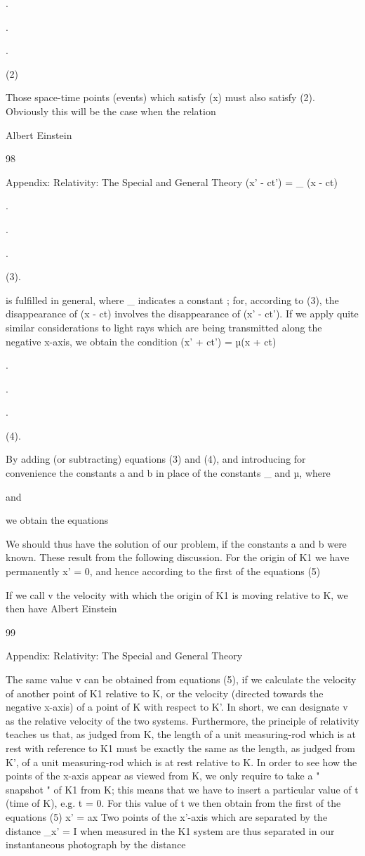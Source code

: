 \documentclass{article}
\begin{document}
.

.

.

(2)

Those space-time points (events) which satisfy (x) must also satisfy (2). Obviously this
will be the case when the relation

Albert Einstein

98

Appendix: Relativity: The Special and General Theory
(x' - ct') = \_ (x - ct)

.

.

.

(3).

is fulfilled in general, where \_ indicates a constant ; for, according to (3), the disappearance
of (x - ct) involves the disappearance of (x' - ct').
If we apply quite similar considerations to light rays which are being transmitted along
the negative x-axis, we obtain the condition
(x' + ct') = µ(x + ct)

.

.

.

(4).

By adding (or subtracting) equations (3) and (4), and introducing for convenience the
constants a and b in place of the constants \_ and µ, where

and

we obtain the equations

We should thus have the solution of our problem, if the constants a and b were known.
These result from the following discussion.
For the origin of K1 we have permanently x' = 0, and hence according to the first of the
equations (5)

If we call v the velocity with which the origin of K1 is moving relative to K, we then have
Albert Einstein

99

Appendix: Relativity: The Special and General Theory

The same value v can be obtained from equations (5), if we calculate the velocity of
another point of K1 relative to K, or the velocity (directed towards the negative x-axis) of a
point of K with respect to K'. In short, we can designate v as the relative velocity of the two
systems.
Furthermore, the principle of relativity teaches us that, as judged from K, the length of a
unit measuring-rod which is at rest with reference to K1 must be exactly the same as the
length, as judged from K', of a unit measuring-rod which is at rest relative to K. In order to
see how the points of the x-axis appear as viewed from K, we only require to take a "
snapshot " of K1 from K; this means that we have to insert a particular value of t (time of
K), e.g. t = 0. For this value of t we then obtain from the first of the equations (5)
x' = ax
Two points of the x'-axis which are separated by the distance \_x' = I when measured in
the K1 system are thus separated in our instantaneous photograph by the distance
\end{document}
